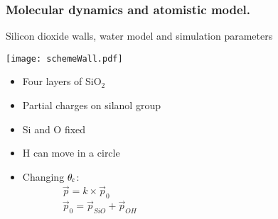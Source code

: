 \documentclass[8pt]{beamer}
\begin{document}
\begin{frame}
	\frametitle{Molecular dynamics and atomistic model.}
	    \vspace{-0.25cm}
		\begin{block}{Silicon dioxide walls, water model and simulation parameters}
			    \vspace{-0.2cm}
				\begin{minipage}{0.23\textwidth}
						\texttt{[image: schemeWall.pdf]}
				\end{minipage}
				\begin{minipage}{0.34\textwidth}
   				 	\begin{itemize}
   				 		\item \small Four layers of SiO$_2$
   				 		\item \small Partial charges on silanol group  
   				     	\item \small Si and O fixed
   				     	\item \small H can move in a circle
						\item \small Changing $\theta_{\rm c}$:\\
						~~~~~~~~$\overrightarrow{p} = k\times \overrightarrow{p}_{0}$\\
						~~~~~~~~$\overrightarrow{p}_0 = \overrightarrow{p}_{SiO} + \overrightarrow{p}_{OH}$\\   				     	
   				 	\end{itemize} 	
				 \end{minipage}
				 \hspace{-0.1cm}
         		\begin{minipage}{0.41\textwidth}
     		        \vspace{-0.2cm} 
			    	\begin{minipage}{0.4\textwidth}
				    \end{minipage}
                    \hspace{-0.25cm}				    

\end{minipage}
\end{block}
\end{frame}
\end{document}
